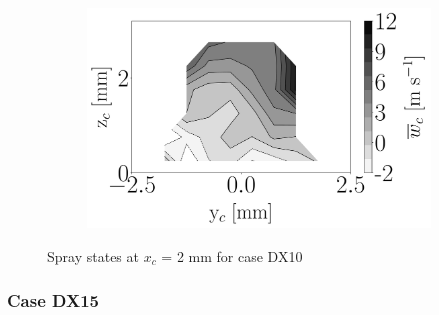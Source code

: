 \begin{figure}[h!]
\begin{subfigure}[b]{0.3\textwidth}
   \includegraphics[scale=\scaleSLIBIMER]{./part3_applications/figures_ch8_resolved/injectors_SLI/dx10_xD06p67_uz_mean_map}
\end{subfigure}
\caption{Spray states at $x_c$ = 2 mm for case DX10}
\label{fig:injectors_sli_BIMER_DX10_xD06p67}
\end{figure}

\clearpage

\subsubsection*{Case DX15}





